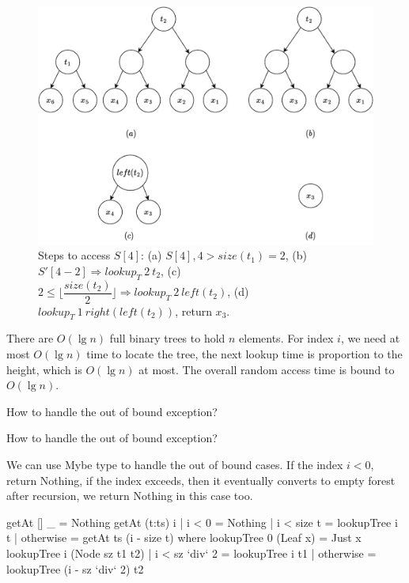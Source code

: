 \documentclass[b5paper]{article}
\begin{document}
\begin{figure}[htbp]
  \centering
  \includegraphics[scale=0.55]{img/bralst-index}
  \caption{Steps to access $S[4]$: (a) $S[4], 4 > size(t_1) = 2$, (b) $S'[4-2] \Rightarrow lookup_T\ 2\ t_2$, (c) $ 2 \leq \lfloor \dfrac{size(t_2)}{2} \rfloor \Rightarrow lookup_T\ 2\ left(t_2)$, (d) $lookup_T\ 1\ right(left(t_2))$, return $x_3$.}
  \label{fig:get-at-example}
\end{figure}

There are $O(\lg n)$ full binary trees to hold $n$ elements. For index $i$, we need at most $O(\lg n)$ time to locate the tree, the next lookup time is proportion to the height, which is $O(\lg n)$ at most. The overall random access time is bound to $O(\lg n)$.

\begin{Exercise}\label{ex:bralist-idx-bound}
How to handle the out of bound exception?
\end{Exercise}

\begin{Answer}[ref = {ex:bralist-idx-bound}]
How to handle the out of bound exception?

We can use Mybe type to handle the out of bound cases. If the index $i < 0$, return Nothing, if the index exceeds, then it eventually converts to empty forest after recursion, we return Nothing in this case too.

\begin{Haskell}
getAt [] _ = Nothing
getAt (t:ts) i | i < 0 = Nothing
               | i < size t = lookupTree i t
               | otherwise = getAt ts (i - size t)
  where
    lookupTree 0 (Leaf x) = Just x
    lookupTree i (Node sz t1 t2) | i < sz `div` 2 = lookupTree i t1
                                 | otherwise = lookupTree (i - sz `div` 2) t2
\end{Haskell}
\end{Answer}
\end{document}
